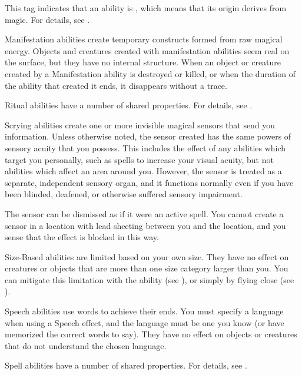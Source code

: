      This tag indicates that an ability is , which means that its origin derives from magic.
    For details, see .

     Manifestation abilities create temporary constructs formed from raw magical energy.
    Objects and creatures created with manifestation abilities seem real on the surface, but they have no internal structure.
    When an object or creature created by a Manifestation ability is destroyed or killed, or when the duration of the ability that created it ends, it disappears without a trace.

     Ritual abilities have a number of shared properties.
    For details, see .

     Scrying abilities create one or more invisible magical sensors that send you information.
    Unless otherwise noted, the sensor created has the same powers of sensory acuity that you possess.
    This includes the effect of any abilities which target you personally, such as spells to increase your visual acuity, but not abilities which affect an area around you.
    However, the sensor is treated as a separate, independent sensory organ, and it functions normally even if you have been blinded, deafened, or otherwise suffered sensory impairment.
    \par The sensor can be dismissed as if it were an active spell.
    You cannot create a sensor in a location with lead sheeting between you and the location, and you sense that the effect is blocked in this way.

     Size-Based abilities are limited based on your own size.
    They have no effect on creatures or objects that are more than one size category larger than you.
    You can mitigate this limitation with the  ability (see ), or simply by flying close (see ).

     Speech abilities use words to achieve their ends.
    You must specify a language when using a Speech effect, and the language must be one you know (or have memorized the correct words to say). They have no effect on objects or creatures that do not understand the chosen language.

     Spell abilities have a number of shared properties.
    For details, see .

